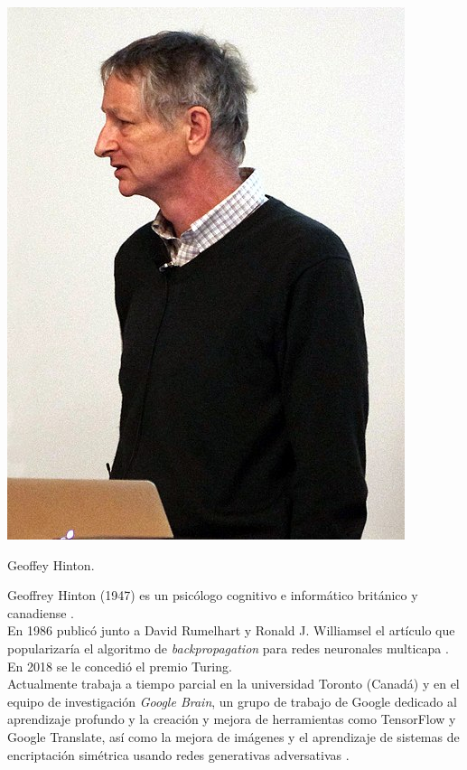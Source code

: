 \documentclass[11pt,twoside,titlepage,a4paper]{article}
\numberwithin{equation}{section} %
\theoremstyle{usual}
\begin{document}
\begin{marginfigure}
    \includegraphics[width=\marginparwidth]{Source/images/Hinto_2013.jpg}
    \caption{Geoffey Hinton.}
\end{marginfigure}

Geoffrey Hinton (1947) es un psicólogo cognitivo e informático británico y canadiense \cite{geoffrey-hinton}. \\

En 1986 publicó junto a David Rumelhart y Ronald J. Williamsel el artículo que popularizaría el algoritmo de \textit{backpropagation} para redes neuronales multicapa \cite{rumelhart-hinton-williams}. \\

En 2018 se le concedió el premio Turing. \\

Actualmente trabaja a tiempo parcial en la universidad Toronto (Canadá) y en el equipo de investigación \textit{Google Brain}, un grupo de trabajo de Google dedicado al aprendizaje profundo y la creación y mejora de herramientas como TensorFlow y Google Translate, así como la mejora de imágenes y el aprendizaje de sistemas de encriptación simétrica usando redes generativas adversativas \cite{Google-Brain}.
\end{document}
